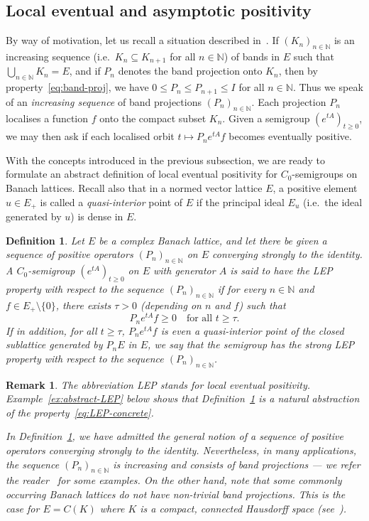 \documentclass[sn-mathphys]{sn-jnl}%
\theoremstyle{thmstyleone}
\theoremstyle{thmstylethree}
\newtheorem{definition}[theorem]{Definition}
\newtheorem{remark}[theorem]{Remark}
\newcommand{\NN}{\mathbb{N}}
\begin{document}
\subsection{Local eventual and asymptotic positivity}
By way of motivation, let us recall a situation described in~\cite[Section 7]{Ar21}. If $(K_n)_{n\in\NN}$ is an increasing sequence (i.e.\ $K_n \subseteq K_{n+1}$ for all $n\in\NN$) of bands in $E$ such that $\bigcup_{n\in\NN}K_n = E$, and if $P_n$ denotes the band projection onto $K_n$, then by property~\eqref{eq:band-proj}, we have $0\le P_n \le P_{n+1} \le I$ for all $n\in\NN$. Thus we speak of an \emph{increasing sequence} of band projections $(P_n)_{n\in\NN}$. Each projection $P_n$ localises a function $f$ onto the compact subset $K_n$. Given a semigroup $(e^{tA})_{t\ge 0}$, we may then ask if each localised orbit $t\mapsto P_n e^{tA}f$ becomes eventually positive.

With the concepts introduced in the previous subsection, we are ready to formulate an abstract definition of local eventual positivity for $C_0$-semigroups on Banach lattices. Recall also that in a normed vector lattice $E$, a positive element $u\in E_+$ is called a \emph{quasi-interior} point of $E$ if the principal ideal $E_u$ (i.e.\ the ideal generated by $u$) is dense in $E$. 
\begin{definition}
	\label{def:abstract-LEP}
	Let $E$ be a complex Banach lattice, and let there be given a sequence of positive operators $(P_n)_{n\in\NN}$ on $E$ converging strongly to the identity. A $C_0$-semigroup $(e^{tA})_{t\ge 0}$ on $E$ with generator $A$ is said to have the \emph{LEP property} with respect to the sequence $(P_n)_{n\in\NN}$ if for every $n\in\NN$ and $f\in E_+\setminus\{0\}$, there exists $\tau>0$ (depending on $n$ and $f$) such that
	\begin{equation}
		\label{eq:LEP}\tag{LEP}
		P_n e^{tA}f \ge 0 \quad\text{for all } t\ge\tau.
	\end{equation}
	If in addition, for all $t\ge\tau$, $P_n e^{tA}f$ is even a quasi-interior point of the closed sublattice generated by $P_n E$ in $E$, we say that the semigroup has the \emph{strong LEP property} with respect to the sequence $(P_n)_{n\in\NN}$.
\end{definition}

\begin{remark}
	The abbreviation LEP stands for \emph{local eventual positivity}. Example~\ref{ex:abstract-LEP} below shows that Definition~\ref{def:abstract-LEP} is a natural abstraction of the property~\eqref{eq:LEP-concrete}.
	
	In Definition~\ref{def:abstract-LEP}, we have admitted the general notion of a sequence of positive operators converging strongly to the identity. Nevertheless, in many applications, the sequence $(P_n)_{n\in\NN}$ is increasing and consists of band projections --- we refer the reader~\cite[Section 5]{Ar21} for some examples. On the other hand, note that some commonly occurring Banach lattices do not have non-trivial band projections. This is the case for $E=C(K)$ where $K$ is a compact, connected Hausdorff space (see~\cite[Example 5, p.\ 63]{Sch}).
\end{remark}
\end{document}
